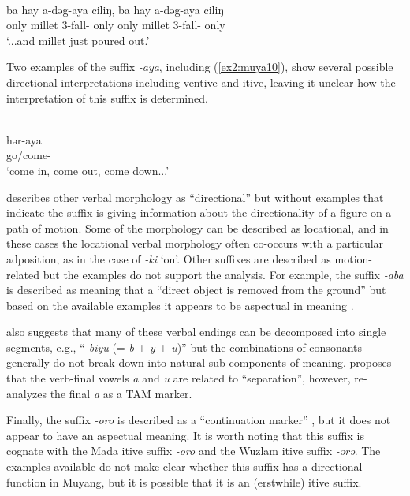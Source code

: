 \ea\label{ex2:muya6}
 \\
\gll ba hay a-dəg-aya ciliŋ, ba hay a-dəg-aya ciliŋ \\
only millet 3-fall- only only millet 3-fall- only \\
\glt `...and millet just poured out.'
\z 

Two examples of the suffix \textit{-aya}, including (\ref{ex2:muya10}), show several possible directional interpretations including ventive and itive, leaving it unclear how the interpretation of this suffix is determined.

\ea\label{ex2:muya10}
 \\
\gll hər-aya	\\
go/come-		\\
\glt `come in, come out, come down...'
\z 

\citet{smithMuyangVerbPhrase2002} describes other verbal morphology as ``directional'' but without examples that indicate the suffix is giving information about the directionality of a figure on a path of motion. Some of the morphology can be described as locational, and in these cases the locational verbal morphology often co-occurs with a particular adposition, as in the case of \textit{-ki} `on'. Other suffixes are described as motion-related but the examples do not support the analysis. For example, the suffix \textit{-aba} is described as meaning that a ``direct object is removed from the ground'' but based on the available examples it appears to be aspectual in meaning \citep[19]{smithMuyangVerbPhrase2002}. 

\citet{smithMuyangVerbPhrase2002} also suggests that many of these verbal endings can be decomposed into single segments, e.g., ``\textit{-biyu} (= \textit{b} + \textit{y} + \textit{u})'' but the combinations of consonants generally do not break down into natural sub-components of meaning. \citet{smithMuyangVerbPhrase2002} proposes that the verb-final vowels \textit{a} and \textit{u} are related to ``separation'', however, \citet[26]{smithDefinitenessTopicalisationTheme2003} re-analyzes the final \textit{a} as a TAM marker. 

Finally, the suffix \textit{-oro} is described as a ``continuation marker'' \citep[22]{smithMuyangVerbPhrase2002}, but it does not appear to have an aspectual meaning. It is worth noting that this suffix is cognate with the Mada itive suffix \textit{-oro} and the Wuzlam itive suffix \textit{-ərə}. The examples available do not make clear whether this suffix has a directional function in Muyang, but it is possible that it is an (erstwhile) itive suffix. 

